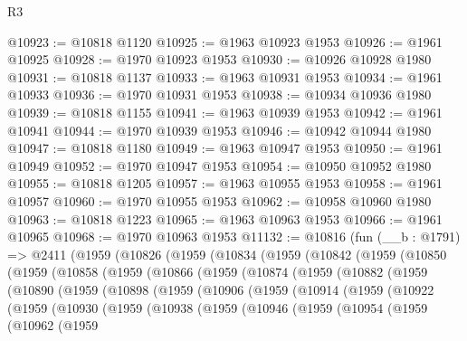 \begin{lexlean}{R3}
\begin{coremodule}
@10923 := @10818 @1120
@10925 := @1963 @10923 @1953
@10926 := @1961 @10925
@10928 := @1970 @10923 @1953
@10930 := @10926 @10928 @1980
@10931 := @10818 @1137
@10933 := @1963 @10931 @1953
@10934 := @1961 @10933
@10936 := @1970 @10931 @1953
@10938 := @10934 @10936 @1980
@10939 := @10818 @1155
@10941 := @1963 @10939 @1953
@10942 := @1961 @10941
@10944 := @1970 @10939 @1953
@10946 := @10942 @10944 @1980
@10947 := @10818 @1180
@10949 := @1963 @10947 @1953
@10950 := @1961 @10949
@10952 := @1970 @10947 @1953
@10954 := @10950 @10952 @1980
@10955 := @10818 @1205
@10957 := @1963 @10955 @1953
@10958 := @1961 @10957
@10960 := @1970 @10955 @1953
@10962 := @10958 @10960 @1980
@10963 := @10818 @1223
@10965 := @1963 @10963 @1953
@10966 := @1961 @10965
@10968 := @1970 @10963 @1953
@11132 := @10816
    (fun (__b : @1791) =>
    @2411
      (@1959
        (@10826
          (@1959
            (@10834
              (@1959
                (@10842
                  (@1959
                    (@10850
                      (@1959
                        (@10858
                          (@1959
                            (@10866
                              (@1959
                                (@10874
                                  (@1959
                                    (@10882
                                      (@1959
                                        (@10890
                                          (@1959
                                            (@10898
                                              (@1959
                                                (@10906
                                                  (@1959
                                                    (@10914
                                                      (@1959
                                                        (@10922
                                                          (@1959
                                                            (@10930
                                                              (@1959
                                                                (@10938
                                                                  (@1959
                                                                    (@10946
                                                                      (@1959
                                                                        (@10954
                                                                          (@1959
                                                                            (@10962
                                                                              (@1959

\end{coremodule}
\end{lexlean}
